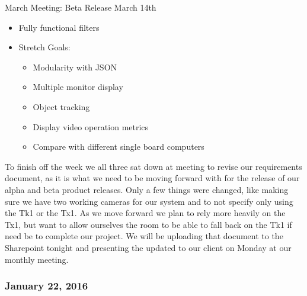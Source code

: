 March Meeting: Beta Release \- March 14th
\begin{itemize}[leftmargin=2cm,labelindent=2cm]
\item Fully functional filters
\item Stretch Goals:
	\begin{itemize}
	\item Modularity with JSON
	\item Multiple monitor display
	\item Object tracking
	\item Display video operation metrics
	\item Compare with different single board computers
	\end{itemize} 
\end{itemize}
To finish off the week we all three sat down at meeting to revise our requirements document, as it is what we need to be moving forward with for the release of our alpha and beta product releases. Only a few things were changed, like making sure we have two working cameras for our system and to not specify only using the Tk1 or the Tx1. As we move forward we plan to rely more heavily on the Tx1, but want to allow ourselves the room to be able to fall back on the Tk1 if need be to complete our project. We will be uploading that document to the Sharepoint tonight and presenting the updated to our client on Monday at our monthly meeting.\\

\subsubsection{January 22, 2016}
